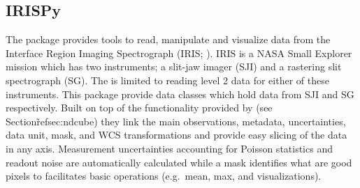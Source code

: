 \subsection{IRISPy}
\label{sec:irispy}

The  package provides tools to read, manipulate and visualize data from the Interface Region Imaging Spectrograph (IRIS; \citealt{DePontieu2014}).
IRIS is a NASA Small Explorer mission which has two instruments; a slit-jaw imager (SJI) and a rastering slit spectrograph (SG).
The  is limited to reading level 2 data for either of these instruments.
This package provide data classes which hold data from SJI and SG respectively.
Built on top of the functionality provided by  (see Section\~ref{sec:ndcube}) they link the main observations, metadata, uncertainties, data unit, mask, and WCS transformations and provide easy slicing of the data in any axis.
Measurement uncertainties accounting for Poisson statistics and readout noise are automatically calculated while a mask identifies what are good pixels to facilitates basic operations (e.g.\ mean, max, and visualizations).
